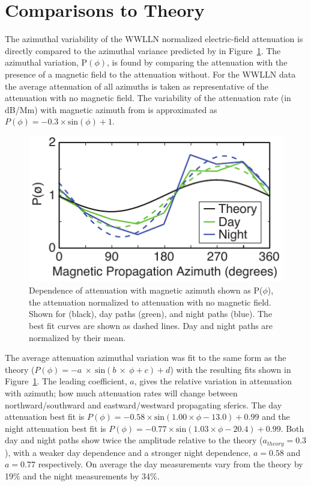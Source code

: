 \section{Comparisons to Theory}

The azimuthal variability of the WWLLN normalized electric-field attenuation is directly compared to the azimuthal variance predicted by \citet{Wait1960a} in Figure~\ref{attenuationTheory}.
The azimuthal variation, P$(\phi)$, is found by comparing the attenuation with the presence of a magnetic field to the attenuation without.
For the WWLLN data the average attenuation of all azimuths is taken as representative of the attenuation with no magnetic field.
The variability of the attenuation rate (in dB/Mm) with magnetic azimuth from \citet{Wait1960a} is approximated as $P(\phi) = - 0.3 \times \text{sin}(\phi) + 1$.

\begin{figure}[h!t]
   \centering
   \includegraphics[scale=1]{Azimuth/Figures/attenuationTheory.pdf} 
   \caption{Dependence of attenuation with magnetic azimuth shown as P($\phi$), the attenuation normalized to attenuation with no magnetic field.
   	Shown for \citet{Wait1960a} (black), day paths (green), and night paths (blue).
	The best fit curves are shown as dashed lines.
	Day and night paths are normalized by their mean.}
   \label{attenuationTheory}
\end{figure}

The average attenuation azimuthal variation was fit to the same form as the theory ($P(\phi) = - a~\times~\text{sin}(b~\times~\phi + c) + d$) with the resulting fits shown in Figure~\ref{attenuationTheory}.
The leading coefficient, $a$, gives the relative variation in attenuation with azimuth; how much attenuation rates will change between northward/southward and eastward/westward propagating sferics.
The day attenuation best fit is $P(\phi) = - 0.58 \times \text{sin}(1.00\times\phi - 13.0) + 0.99$ and the night attenuation best fit is $P(\phi) = - 0.77 \times \text{sin}(1.03\times\phi - 20.4) + 0.99$.
Both day and night paths show twice the amplitude relative to the theory ($a_{theory} = 0.3$), with a weaker day dependence and a stronger night dependence, $a=0.58$ and $a=0.77$ respectively.
On average the day measurements vary from the theory by 19\% and the night measurements by 34\%.

